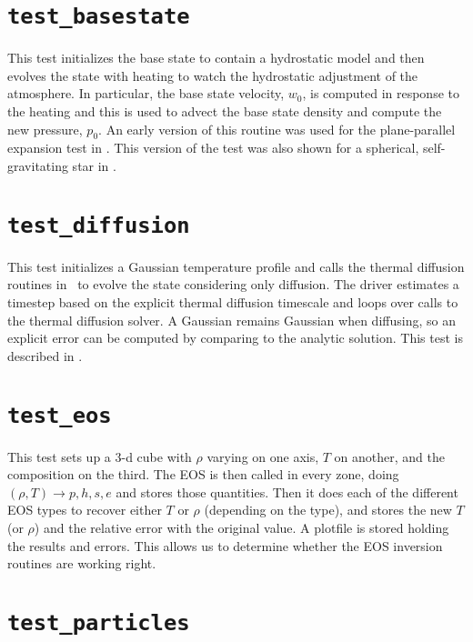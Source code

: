\section {\tt test\_basestate} 

  This test initializes the base state to contain a hydrostatic
  model and then evolves the state with heating to watch the 
  hydrostatic adjustment of the atmosphere.  In particular,
  the base state velocity, $w_0$, is computed in response to 
  the heating and this is used to advect the base state density
  and compute the new pressure, $p_0$.  An early version of 
  this routine was used for the plane-parallel expansion test
  in \cite{lowMach2}.  This version of the test was also shown
  for a spherical, self-gravitating star in \cite{multilevel}.

  
\section {\tt test\_diffusion}

  This test initializes a Gaussian temperature profile and calls
  the thermal diffusion routines in \maestro\ to evolve the state 
  considering only diffusion.  The driver estimates a timestep
  based on the explicit thermal diffusion timescale and loops
  over calls to the thermal diffusion solver.  A Gaussian remains
  Gaussian when diffusing, so an explicit error can be computed
  by comparing to the analytic solution.  This test is 
  described in \cite{xrb}.


\section {\tt test\_eos}

  This test sets up a 3-d cube with $\rho$ varying on one axis, $T$ on
  another, and the composition on the third.  The EOS is then called
  in every zone, doing $(\rho, T) \rightarrow  p, h, s, e$  and stores those
  quantities.  Then it does each of the different EOS types to recover
  either $T$ or $\rho$ (depending on the type), and stores the new $T$ (or
  $\rho$) and the relative error with the original value.  A plotfile is
  stored holding the results and errors.  This allows us to determine
  whether the EOS inversion routines are working right.


\section {\tt test\_particles}

